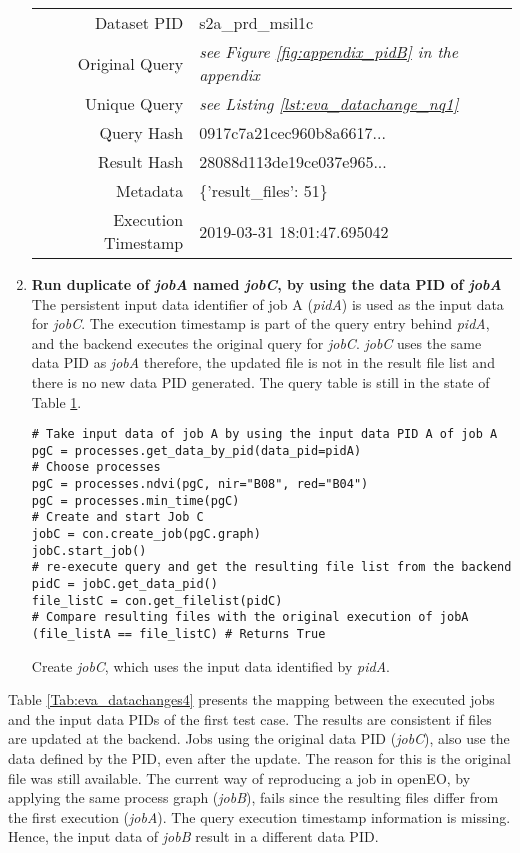 \documentclass[draft,final]{vutinfth} %
\newenvironment{code}{\captionsetup{type=listing}}{}
\begin{document}
\begin{enumerate}
\begin{table}[]
\begin{tabular}{|r|l|}
			Dataset PID & s2a\_prd\_msil1c  \\ 
			Original Query & \textit{see Figure \ref{fig:appendix_pidB} in the appendix} \\
			Unique Query & \textit{see Listing \ref{lst:eva_datachange_nq1}}  \\
			Query Hash & {\color{blue}0917c7a21cec960b8a6617...}  \\
			Result Hash & {\color{red}28088d113de19ce037e965...}  \\
			Metadata & \{'result\_files': 51\}  \\
			Execution Timestamp & 2019-03-31 18:01:47.695042   \\ \hline
		\end{tabular}
		\label{Tab:eva_datachanges3}
	\end{table}
	\newpage
	\item \textbf{Run duplicate of \textit{jobA} named \textit{jobC}, by using the data PID of \textit{jobA} }\\
	The persistent input data identifier of job A (\textit{pidA}) is used as the input data for \textit{jobC}. The execution timestamp is part of the query entry behind \textit{pidA}, and the backend executes the original query for \textit{jobC}. \textit{jobC} uses the same data PID as \textit{jobA} therefore, the updated file is not in the result file list and there is no new data PID generated. The query table is still in the state of Table \ref{Tab:eva_datachanges3}. 
	\begin{code}
		\begin{verbatim}
# Take input data of job A by using the input data PID A of job A
pgC = processes.get_data_by_pid(data_pid=pidA)
# Choose processes
pgC = processes.ndvi(pgC, nir="B08", red="B04")
pgC = processes.min_time(pgC)
# Create and start Job C
jobC = con.create_job(pgC.graph)
jobC.start_job()
# re-execute query and get the resulting file list from the backend
pidC = jobC.get_data_pid()
file_listC = con.get_filelist(pidC)
# Compare resulting files with the original execution of jobA
(file_listA == file_listC) # Returns True
		\end{verbatim}
		\caption{Create \textit{jobC}, which uses the input data identified by \textit{pidA}.}
		\label{lst:eva_datachange_5}
	\end{code}
\end{enumerate}

Table \ref{Tab:eva_datachanges4} presents the mapping between the executed jobs and the input data PIDs of the first test case. The results are consistent if files are updated at the backend. Jobs using the original data PID (\textit{jobC}), also use the data defined by the PID, even after the update. The reason for this is the original file was still available. The current way of reproducing a job in openEO, by applying the same process graph (\textit{jobB}), fails since the resulting files differ from the first execution (\textit{jobA}). The query execution timestamp information is missing. Hence, the input data of \textit{jobB} result in a different data PID.       
\end{document}
